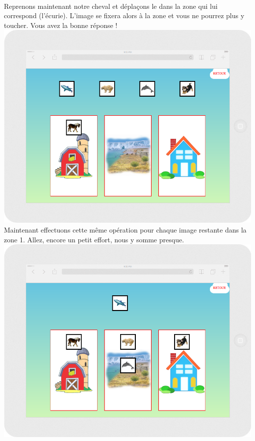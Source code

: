 \documentclass{article}
\begin{document}
\vspace{0.5cm}\\
Reprenons maintenant notre cheval et dépla\c{c}ons le dans la zone qui lui correspond (l'écurie). L'image se fixera alors à la zone et vous ne pourrez plus y toucher. Vous avez la bonne réponse !
\vspace{0.5cm}\\
\includegraphics[width=1.0\textwidth]{zone4}
\vspace{0.5cm}\\
Maintenant effectuons cette même opération pour chaque image restante dans la zone 1. Allez, encore un petit effort, nous y somme presque.
\vspace{0.5cm}\\
\includegraphics[width=1.0\textwidth]{zone5}
\end{document}
